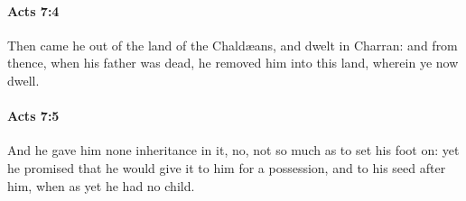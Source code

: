 		\paragraph{Acts 7:4} %
			\label{ACTS-7-4}

			Then came he out of the land of the Chaldæans, and dwelt in Charran: and from thence, when his father was dead, he removed him into this land, wherein ye now dwell.

			\begin{framed}
			\scriptsize
				\begin{compactdesc}
					\item[SBLG] 
				\end{compactdesc}
			\end{framed}

		\paragraph{Acts 7:5} %
			\label{ACTS-7-5}

			And he gave him none inheritance in it, no, not so much as to set his foot on: yet he promised that he would give it to him for a possession, and to his seed after him, when as yet he had no child.

